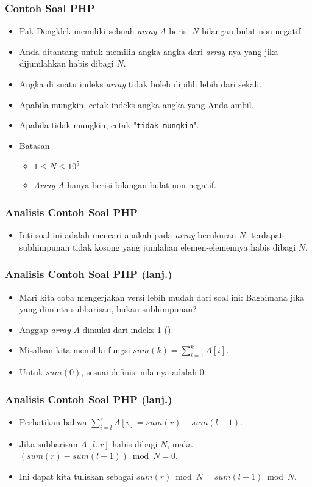 \begin{frame}
\frametitle{Contoh Soal PHP}
\begin{itemize}
  \item Pak Dengklek memiliki sebuah \textit{array} $A$ berisi $N$ bilangan bulat non-negatif.
  \item Anda ditantang untuk memilih angka-angka dari \textit{array}-nya yang jika dijumlahkan habis dibagi $N$.
  \item Angka di suatu indeks \textit{array} tidak boleh dipilih lebih dari sekali.
  \item Apabila mungkin, cetak indeks angka-angka yang Anda ambil.
  \item Apabila tidak mungkin, cetak "\texttt{tidak mungkin}".
  \item Batasan
  \begin{itemize}
    \item $1 \leq N \leq 10^{5}$
    \item \textit{Array} $A$ hanya berisi bilangan bulat non-negatif.
  \end{itemize}
\end{itemize}
\end{frame}

\begin{frame}
\frametitle{Analisis Contoh Soal PHP}
\begin{itemize}
  \item Inti soal ini adalah mencari apakah pada \textit{array} berukuran $N$, terdapat subhimpunan tidak kosong yang jumlahan elemen-elemennya habis dibagi $N$.
\end{itemize}
\end{frame}

\begin{frame}
\frametitle{Analisis Contoh Soal PHP (lanj.)}
\begin{itemize}
  \item Mari kita coba mengerjakan versi lebih mudah dari soal ini:
  Bagaimana jika yang diminta subbarisan, bukan subhimpunan?
  \item Anggap \textit{array} $A$ dimulai dari indeks 1 ().
  \item Misalkan kita memiliki fungsi $sum(k) = \sum\limits_{i=1}^k A[i]$.
  \item Untuk $sum(0)$, sesuai definisi nilainya adalah $0$.
\end{itemize}
\end{frame}

\begin{frame}
\frametitle{Analisis Contoh Soal PHP (lanj.)}
\begin{itemize}
  \item Perhatikan bahwa $\sum\limits_{i=l}^r A[i] = sum(r) - sum(l - 1)$.
  \newline
  \item Jika subbarisan $A[l..r]$ habis dibagi $N$, maka $(sum(r) - sum(l - 1)) \bmod N = 0$.
  \newline
  \item Ini dapat kita tuliskan sebagai $sum(r) \bmod N = sum(l - 1) \bmod N$.
\end{itemize}
\end{frame}

